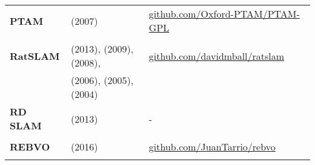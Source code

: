 \documentclass[a4paper,12pt]{scrartcl}
\begin{document}
{\begin{longtable}{l|l|l}
    \textbf{PTAM}                                                                                                                 & \cite{Klein2007} (2007)
                                                                                                                                  & {\href{https://github.com/Oxford-PTAM/PTAM-GPL}{github.com/Oxford-PTAM/PTAM-GPL}}         \\
                                                                                                                                  &                                                                                            &   \\ [-3mm]
    \textbf{RatSLAM}                                                                                                              & \cite{Ball2013} (2013), \cite{Maddern2009} (2009), \cite{Milford2008} (2008),
                                                                                                                                  & {\href{https://github.com/davidmball/ratslam}{github.com/davidmball/ratslam}}             \\
                                                                                                                                  & \cite{Milford2006} (2006), \cite{Milford2005} (2005), \cite{Milford2004} (2004)            &   \\
    \textbf{RD SLAM}                                                                                                              & \cite{Tan2013a} (2013)                                                                     & - \\
                                                                                                                                  &                                                                                            &   \\ [-3mm]
    \textbf{REBVO}                                                                                                                & \cite{Tarrio2016} (2016)
                                                                                                                                  & {\href{https://github.com/JuanTarrio/rebvo}{github.com/JuanTarrio/rebvo}}                 \\
                                                                                                                                  &                                                                                            &   \\ [-3mm]

\end{longtable}}
\end{document}

